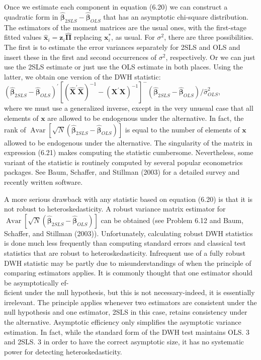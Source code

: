 \documentclass[10pt]{article}
\begin{document}
Once we estimate each component in equation (6.20) we can construct a quadratic form in $\hat{\boldsymbol{\beta}}_{2 S L S}-\hat{\boldsymbol{\beta}}_{O L S}$ that has an asymptotic chi-square distribution. The estimators of the moment matrices are the usual ones, with the first-stage fitted values $\hat{\mathbf{x}}_{i}=\mathbf{z}_{i} \hat{\boldsymbol{\Pi}}$ replacing $\mathbf{x}_{i}^{*}$, as usual. For $\sigma^{2}$, there are three possibilities. The first is to estimate the error variances separately for 2SLS and OLS and insert these in the first and second occurrences of $\sigma^{2}$, respectively. Or we can just use the 2SLS estimate or just use the OLS estimate in both places. Using the latter, we obtain one version of the DWH statistic:\\
$\left(\hat{\boldsymbol{\beta}}_{2 S L S}-\hat{\boldsymbol{\beta}}_{O L S}\right)^{\prime}\left[\left(\hat{\mathbf{X}}^{\prime} \hat{\mathbf{X}}\right)^{-1}-\left(\mathbf{X}^{\prime} \mathbf{X}\right)^{-1}\right]^{-}\left(\hat{\boldsymbol{\beta}}_{2 S L S}-\hat{\boldsymbol{\beta}}_{O L S}\right) / \hat{\sigma}_{O L S}^{2}$,\\
where we must use a generalized inverse, except in the very unusual case that all elements of $\mathbf{x}$ are allowed to be endogenous under the alternative. In fact, the rank of $\operatorname{Avar}\left[\sqrt{N}\left(\hat{\boldsymbol{\beta}}_{2 S L S}-\hat{\boldsymbol{\beta}}_{O L S}\right)\right]$ is equal to the number of elements of $\mathbf{x}$ allowed to be endogenous under the alternative. The singularity of the matrix in expression (6.21) makes computing the statistic cumbersome. Nevertheless, some variant of the statistic is routinely computed by several popular econometrics packages. See Baum, Schaffer, and Stillman (2003) for a detailed survey and recently written software.

A more serious drawback with any statistic based on equation (6.20) is that it is not robust to heteroskedasticity. A robust variance matrix estimator for $\operatorname{Avar}\left[\sqrt{N}\left(\hat{\boldsymbol{\beta}}_{2 S L S}-\hat{\boldsymbol{\beta}}_{O L S}\right)\right]$ can be obtained (see Problem 6.12 and Baum, Schaffer, and Stillman (2003)). Unfortunately, calculating robust DWH statistics is done much less frequently than computing standard errors and classical test statistics that are robust to heteroskedasticity. Infrequent use of a fully robust DWH statistic may be partly due to misunderstandings of when the principle of comparing estimators applies. It is commonly thought that one estimator should be asymptotically ef-\\
ficient under the null hypothesis, but this is not necessary-indeed, it is essentially irrelevant. The principle applies whenever two estimators are consistent under the null hypothesis and one estimator, 2SLS in this case, retains consistency under the alternative. Asymptotic efficiency only simplifies the asymptotic variance estimation. In fact, while the standard form of the DWH test maintains OLS. 3 and 2SLS. 3 in order to have the correct asymptotic size, it has no systematic power for detecting heteroskedasticity.
\end{document}
